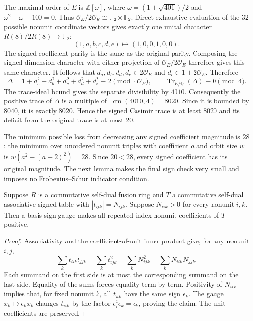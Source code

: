 The maximal order of $E$ is $\mathbb Z[\omega]$, where
$\omega=(1+\sqrt{401})/2$ and
$\omega^2-\omega-100=0$. Thus
$\mathcal O_E/2\mathcal O_E\cong\mathbb F_2\times\mathbb F_2$.
Direct exhaustive evaluation of the $32$ possible nonunit coordinate
vectors gives exactly one unital character $R(8)/2R(8)\to\mathbb F_2$:
\[
(1,a,b,c,d,e)\longmapsto(1,0,0,1,0,0).
\]
The signed coefficient parity is the same as the original parity.
Composing the signed dimension character with either projection of
$\mathcal O_E/2\mathcal O_E$ therefore gives this same character. It follows
that $d_a,d_b,d_d,d_e\in2\mathcal O_E$ and
$d_c\in1+2\mathcal O_E$. Therefore
\[
\Delta=1+d_a^2+d_b^2+d_c^2+d_d^2+d_e^2
       \equiv2\pmod{4\mathcal O_E},
\qquad \operatorname{Tr}_{E/\mathbb Q}(\Delta)\equiv0\pmod4.
\]
The trace-ideal bound gives the separate divisibility by $4010$.
Consequently the positive trace of $\Delta$ is a multiple of
$\operatorname{lcm}(4010,4)=8020$. Since it is bounded by $8040$, it is
exactly $8020$. Hence the signed Casimir trace is at least $8020$ and its
deficit from the original trace is at most $20$.

The minimum possible loss from decreasing any signed coefficient magnitude
is $28$: the minimum over unordered nonunit triples with coefficient $a$
and orbit size $w$ is $w(a^2-(a-2)^2)=28$. Since $20<28$, every signed
coefficient has its original magnitude. The next lemma makes the final
sign check very small and imposes no Frobenius--Schur indicator condition.

\begin{lemma}
Suppose $R$ is a commutative self-dual fusion ring and $T$ a commutative
self-dual associative signed table with $|t_{ijk}|=N_{ijk}$.
Suppose $N_{iik}>0$ for every nonunit $i,k$. Then a basis sign gauge makes
all repeated-index nonunit coefficients of $T$ positive.
\end{lemma}
\begin{proof}
Associativity and the coefficient-of-unit inner product give, for any
nonunit $i,j$,
\[
\sum_k t_{iik}t_{jjk}=\sum_k t_{ijk}^2
=\sum_k N_{ijk}^2=\sum_k N_{iik}N_{jjk}.
\]
Each summand on the first side is at most the corresponding summand on the
last side. Equality of the sums forces equality term by term. Positivity
of $N_{iik}$ implies that, for fixed nonunit $k$, all $t_{iik}$ have the
same sign $\epsilon_k$. The gauge $x_k\mapsto\epsilon_k x_k$ changes
$t_{iik}$ by the factor $\epsilon_i^2\epsilon_k=\epsilon_k$, proving the
claim. The unit coefficients are preserved.
\end{proof}


